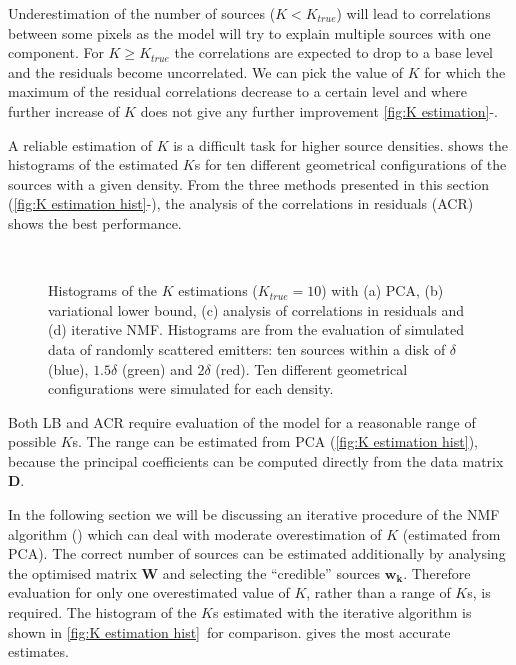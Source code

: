 \begin{enumerate}
	Underestimation of the number of sources ($K<K_{true}$) will lead to correlations between some pixels as the model will try to explain multiple sources with one component. For $K\geq K_{true}$ the correlations are expected to drop to a base level and the residuals become uncorrelated. We can pick the value of $K$ for which the maximum of the residual correlations decrease to a certain level and where further increase of $K$ does not give any further improvement \autoref{fig:K estimation}\gggg-\iii.
\end{enumerate}

A reliable estimation of $K$ is a difficult task for higher source densities.  shows the histograms of the estimated $K$s for ten different geometrical configurations of the sources with a given density. From the three methods presented in this section  (\autoref{fig:K estimation hist}\aaa-\ccc), the analysis of the correlations in residuals (ACR) shows the best performance.
%
\begin{figure}[!hbt]
	\newcommand{\sizef}{.4}		
	\centering
	\\
	\caption{Histograms of the $K$ estimations ($K_{true}=10$) with (a) PCA, (b) variational lower bound, (c) analysis of correlations in residuals and (d) iterative NMF. Histograms are from the evaluation of simulated data of randomly scattered emitters: ten sources within a disk of $\delta$ (blue), $1.5\delta$ (green) and $2\delta$ (red). Ten different geometrical configurations were simulated for each density.}
	\label{fig:K estimation hist}
\end{figure}

Both LB and ACR require evaluation of the model for a reasonable range of possible $K$s. The range can be estimated from PCA  (\autoref{fig:K estimation hist}\ccc), because the principal coefficients can be computed directly from the data matrix $\bm{D}$.

In the following section we will be discussing an iterative procedure of the NMF algorithm (\inmf{}) which can deal with moderate overestimation of $K$  (estimated from PCA). The correct number of sources can be estimated additionally by analysing the optimised matrix $\bm{W}$ and selecting the ``credible'' sources $\bm{w_k}$. Therefore evaluation for only one overestimated value of $K$, rather than a range of $K$s, is required. The histogram of the $K$s estimated with the iterative algorithm is shown in  \autoref{fig:K estimation hist}\ddd\ for comparison. \inmf{} gives the most accurate estimates. 

